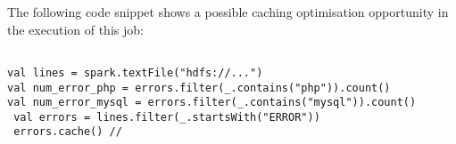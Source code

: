 \documentclass[11pt]{article}
\begin{document}
The following code snippet shows a possible caching optimisation opportunity in the execution of this job:

\begin{lstlisting}
 
val lines = spark.textFile("hdfs://...")
val num_error_php = errors.filter(_.contains("php")).count()
val num_error_mysql = errors.filter(_.contains("mysql")).count()
 val errors = lines.filter(_.startsWith("ERROR"))
 errors.cache() // 

\end{lstlisting} 



\end{document}
